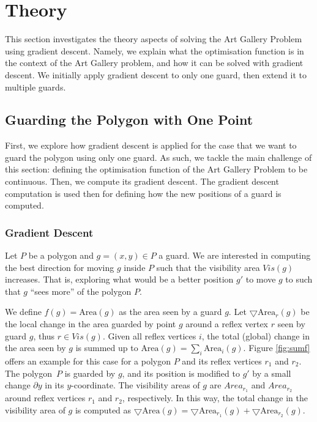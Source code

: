 \section{Theory}
\label{sec:theory}

This section investigates the theory aspects of solving the Art Gallery Problem using gradient descent. Namely, we explain what the optimisation function is in the context of the Art Gallery problem, and how it can be solved with gradient descent. We initially apply gradient descent to only one guard, then extend it to multiple guards.

\subsection{Guarding the Polygon with One Point}

First, we explore how gradient descent is applied for the case that we want to guard the polygon using only one guard. As such, we tackle the main challenge of this section: defining the optimisation function of the Art Gallery Problem to be continuous. Then, we compute its gradient descent. The gradient descent computation is used then for defining how the new positions of a guard is computed.

\subsubsection{Gradient Descent}
\label{sec:gradient}

Let $P$ be a polygon and $g = (x, y) \in P$ a guard. We are interested in computing the best direction for moving $g$ inside $P$ such that the visibility area $\mathit{Vis}(g)$ increases. That is, exploring what would be a better position $g'$ to move $g$ to such that $g$ ``sees more'' of the polygon $P$. 

We define $f(g) = \text{Area}(g)$ as the area seen by a guard $g$. Let $\bigtriangledown \text{Area}_r(g)$ be the local change in the area guarded by point $g$ around a reflex vertex $r$ seen by guard $g$, thus $r \in \mathit{Vis(g)}$. Given all reflex vertices $i$, the total (global) change in the area seen by $g$ is summed up to $\text{Area}(g) = \sum_i \text{Area}_i(g)$. Figure \ref{fig:sumf} offers an example for this case for a polygon $P$ and its reflex vertices $r_1$ and $r_2$. The polygon~$P$ is guarded by $g$, and its position is modified to $g'$ by a small change $\partial y$ in its $y$-coordinate. The visibility areas of $g$ are $Area_{r_1}$ and $Area_{r_2}$ around reflex vertices $r_1$ and $r_2$, respectively. In this way, the total change in the visibility area of $g$ is computed as $\bigtriangledown \text{Area}(g) = \bigtriangledown \text{Area}_{r_1}(g) + \bigtriangledown \text{Area}_{r_2}(g)$.

